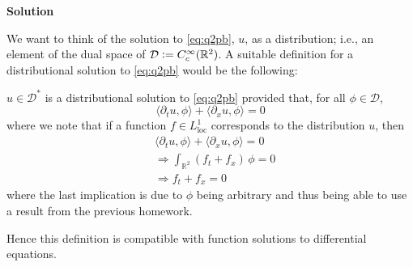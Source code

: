 \documentclass{article}
\begin{document}
\textbf{Solution}

We want to think of the solution to \eqref{eq:q2pb}, $u$, as a
distribution; i.e., an element of the dual space of
$\mathcal{D} \vcentcolon= C_c^\infty(\mathbb{R}^2)$. A suitable
definition for a distributional solution to \eqref{eq:q2pb} would be the
following:

$u \in \mathcal{D}^*$ is a distributional solution to \eqref{eq:q2pb}
provided that, for all $\phi \in \mathcal{D}$,
%
\begin{equation*}
    \langle \partial_t u, \phi \rangle + \langle \partial_x u, \phi \rangle = 0
\end{equation*}
%
where we note that if a function $f \in L_{\text{loc}}^1$ corresponds to
the distribution $u$, then
%
\begin{align*}
    &\langle \partial_t u, \phi \rangle + \langle \partial_x u, \phi \rangle = 0 \\
    &\Rightarrow \int_{\mathbb{R}^2} (f_t + f_x) \,\phi = 0 \\
    &\Rightarrow f_t + f_x = 0
\end{align*}
%
where the last implication is due to $\phi$ being arbitrary and thus
being able to use a result from the previous homework.

Hence this definition is compatible with function solutions to
differential equations.
\end{document}
